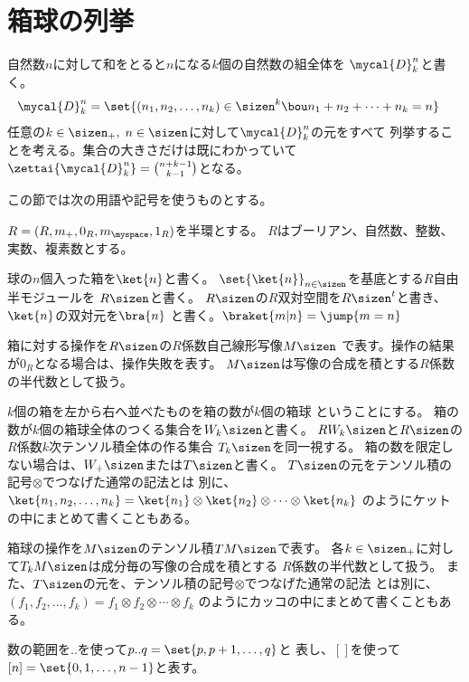 \begingroup %
	\newcommand{\hakodama}{\mycal{D}}
	\newcommand{\sosei}{\mycal{C}}
	\newcommand{\bunkatu}{\mycal{P}}
	\newcommand{\myeven}{\ensuremath{{2\sizen}}}
	\newcommand{\myodd}{\ensuremath{{2\sizen+1}}}
	\newcommand{\kazu}[1]{\ensuremath{{\sharp_{\myop{#1}}}}}
	\setlength\arraycolsep{2pt}
\section{箱球の列挙}\label{s1:箱球の列挙} %
	自然数$n$に対して和をとると$n$になる$k$個の自然数の組全体を
	$\hakodama_k^n$と書く。
	\begin{equation*}\begin{split} %
		\mycal{D}_k^n &= \set{(n_1,n_2,\dots,n_k)\in\sizen^k
			\bou n_1+n_2+\cdots+n_k=n}
	\end{split}\end{equation*} %
	任意の$k\in\sizen_+,\;n\in\sizen$に対して$\mycal{D}_k^n$の元をすべて
	列挙することを考える。集合の大きさだけは既にわかっていて
	$\zettai{\hakodama_k^n}=\binom{n+k-1}{k-1}$となる。

	この節では次の用語や記号を使うものとする。
	\begin{description}\setlength{\itemsep}{-1mm} %
		\item[係数] $R=(R,m_+,0_R,m_\myspace,1_R)$を半環とする。
		$R$はブーリアン、自然数、整数、実数、複素数とする。
		\item[箱] 球の$n$個入った箱を$\ket{n}$と書く。
		$\set{\ket{n}}_{n\in\sizen}$を基底とする$R$自由半モジュールを
		$R\sizen$と書く。
		$R\sizen$の$R$双対空間を$R\sizen^t$と書き、$\ket{n}$の双対元を$\bra{n}$
		と書く。$\braket{m|n}=\jump{m=n}$
		\item[箱の操作] 箱に対する操作を$R\sizen$の$R$係数自己線形写像$M\sizen$
		で表す。操作の結果が$0_R$となる場合は、操作失敗を表す。
		$M\sizen$は写像の合成を積とする$R$係数の半代数として扱う。
		\item[箱球] $k$個の箱を左から右へ並べたものを箱の数が$k$個の箱球
		ということにする。
		箱の数が$k$個の箱球全体のつくる集合を$W_k\sizen$と書く。
		$RW_k\sizen$と$R\sizen$の$R$係数$k$次テンソル積全体の作る集合
		$T_k\sizen$を同一視する。
		箱の数を限定しない場合は、$W_+\sizen$または$T\sizen$と書く。
		$T\sizen$の元をテンソル積の記号$\otimes$でつなげた通常の記法とは
		別に、$\ket{n_1,n_2,\dots,n_k}
		=\ket{n_1}\otimes\ket{n_2}\otimes\cdots\otimes\ket{n_k}$
		のようにケットの中にまとめて書くこともある。
		\item[箱球の操作] 箱球の操作を$M\sizen$のテンソル積$TM\sizen$で表す。
		各$k\in\sizen_+$に対して$T_kM\sizen$は成分毎の写像の合成を積とする
		$R$係数の半代数として扱う。
		また、$T\sizen$の元を、テンソル積の記号$\otimes$でつなげた通常の記法
		とは別に、$(f_1,f_2,\dots,f_k)
		=f_1\otimes f_2\otimes\cdots\otimes f_k$
		のようにカッコの中にまとめて書くこともある。
		\item[数の集合] 数の範囲を$..$を使って$p..q=\set{p,p+1,\dots,q}$と
		表し、$[]$を使って$[n]=\set{0,1,\dots,n-1}$と表す。
	\end{description} %

